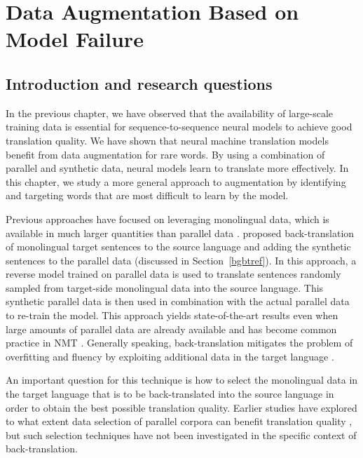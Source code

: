 
\chapter{Data Augmentation Based on Model Failure}

\label{chapter:research-03}

\section{Introduction and research questions}

In the previous chapter, we have observed that the availability of large-scale training data is essential for sequence-to-sequence neural models to achieve good translation quality.
We have shown that neural machine translation models benefit from data augmentation for rare words.
By using a combination of parallel and synthetic data, neural models learn to translate more effectively.
In this chapter, we study a more general approach to augmentation by identifying and targeting words that are most difficult to learn by the model.

Previous approaches have focused on leveraging monolingual data, which is available in much larger quantities than parallel data \citep{Lambert:2011:ITM:2132960.2132997}. 
\citet{sennrich-haddow-birch:2016:P16-11} proposed {back-translation} of monolingual target sentences to the source language and adding the synthetic sentences to the parallel data (discussed in Section~\ref{bgbtref}).
In this approach, a reverse model trained on parallel data is used to translate sentences randomly sampled from target-side monolingual data into the source language.
This synthetic parallel data is then used in combination with the actual parallel data to re-train the model.
This approach yields state-of-the-art results even when large amounts of parallel data are already available and has become common practice in NMT \citep{2017arXiv170800726S,2017arXiv170704499G,2017arXiv171107893H}.
Generally speaking, back-translation mitigates the problem of overfitting and fluency by exploiting additional data in the target language \citep{sennrich-haddow-birch:2016:P16-11}.

An important question for this technique is how to select the monolingual data in the target language that is to be back-translated into the source language in order to obtain the best possible translation quality. 
Earlier studies have explored to what extent data selection of parallel corpora can benefit translation quality \citep{D11-1033,vanderwees-bisazza-monz:2017:EMNLP2017}, but such selection techniques have not been investigated in the specific context of back-translation. 

